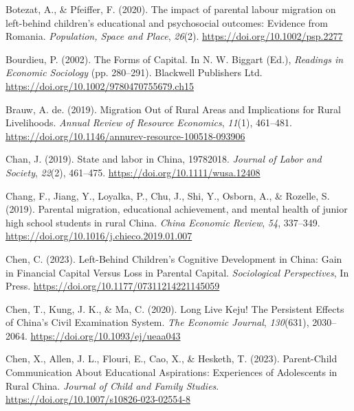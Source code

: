 \documentclass[
  man,floatsintext]{apa7}
\newlength{\cslhangindent}
\newlength{\cslentryspacingunit} %
\newenvironment{CSLReferences}[2] %
 {%
  \setlength{\parindent}{0pt}
  \ifodd #1
  \let\oldpar\par
  \def\par{\hangindent=\cslhangindent\oldpar}
  \fi
  \setlength{\parskip}{#2\cslentryspacingunit}
 }%
 {}
\begin{document}
\begin{CSLReferences}{1}{0}
\leavevmode{}%
Botezat, A., \& Pfeiffer, F. (2020). The impact of parental labour migration on left{-}behind children's educational and psychosocial outcomes: Evidence from Romania. \emph{Population, Space and Place}, \emph{26}(2). \url{https://doi.org/10.1002/psp.2277}

\leavevmode{}%
Bourdieu, P. (2002). The Forms of Capital. In N. W. Biggart (Ed.), \emph{Readings in Economic Sociology} (pp. 280--291). Blackwell Publishers Ltd. \url{https://doi.org/10.1002/9780470755679.ch15}

\leavevmode{}%
Brauw, A. de. (2019). Migration Out of Rural Areas and Implications for Rural Livelihoods. \emph{Annual Review of Resource Economics}, \emph{11}(1), 461--481. \url{https://doi.org/10.1146/annurev-resource-100518-093906}

\leavevmode{}%
Chan, J. (2019). State and labor in {China}, 1978{\textendash}2018. \emph{Journal of Labor and Society}, \emph{22}(2), 461--475. \url{https://doi.org/10.1111/wusa.12408}

\leavevmode{}%
Chang, F., Jiang, Y., Loyalka, P., Chu, J., Shi, Y., Osborn, A., \& Rozelle, S. (2019). Parental migration, educational achievement, and mental health of junior high school students in rural {China}. \emph{{China} Economic Review}, \emph{54}, 337--349. \url{https://doi.org/10.1016/j.chieco.2019.01.007}

\leavevmode{}%
Chen, C. (2023). Left-Behind Children{'}s Cognitive Development in {China}: Gain in Financial Capital Versus Loss in Parental Capital. \emph{Sociological Perspectives}, In Press. \url{https://doi.org/10.1177/07311214221145059}

\leavevmode{}%
Chen, T., Kung, J. K., \& Ma, C. (2020). Long Live Keju! The Persistent Effects of {China}{'}s Civil Examination System. \emph{The Economic Journal}, \emph{130}(631), 2030--2064. \url{https://doi.org/10.1093/ej/ueaa043}

\leavevmode{}%
Chen, X., Allen, J. L., Flouri, E., Cao, X., \& Hesketh, T. (2023). Parent-Child Communication About Educational Aspirations: Experiences of Adolescents in Rural {China}. \emph{Journal of Child and Family Studies}. \url{https://doi.org/10.1007/s10826-023-02554-8}


\end{CSLReferences}
\end{document}
